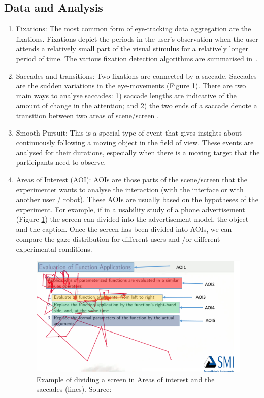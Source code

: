 \documentclass{sig-alternate}
\begin{document}
\subsection{Data and Analysis}

\begin{enumerate}
\item Fixations: The most common form of eye-tracking data aggregation are the fixations. Fixations depict the periods in the user's observation when the user attends a relatively small part of the visual stimulus for a relatively longer period of time. The various fixation detection algorithms are summarised in~\cite{duchowski2007eye}. 

\item Saccades and transitions: Two fixations are connected by a saccade. Saccades are the sudden variations in the eye-movements (Figure \ref{aoi}). There are two main ways to analyse saccades: 1) saccade lengths are indicative of the amount of change in the attention; and 2) the two ends of a saccade denote a transition between two areas of scene/screen .

\item Smooth Pursuit: This is a special type of event that gives insights about continuously following a moving object in the field of view. These events are analysed for their durations, especially when there is a moving target that the participants need to observe.

\item Areas of Interest (AOI):  AOIs are those parts of the scene/screen that the experimenter wants to analyse the interaction (with the interface or with another user / robot). These AOIs are usually based on the hypotheses of the experiment. For example, if in a usability study of a phone advertisement (Figure \ref{aoi}) the screen can divided into the advertisement model, the object and the caption. Once the screen has been divided into AOIs, we can compare the gaze distribution for different users and /or different experimental conditions.

\begin{figure}
    \centering
    \includegraphics[width=\linewidth]{scanpathVars}
    \caption{Example of dividing a screen in Areas of interest and the saccades 
    (lines). Source: \cite{sharma2014how}}
    \label{aoi}
\end{figure}



\end{enumerate}
\end{document}
